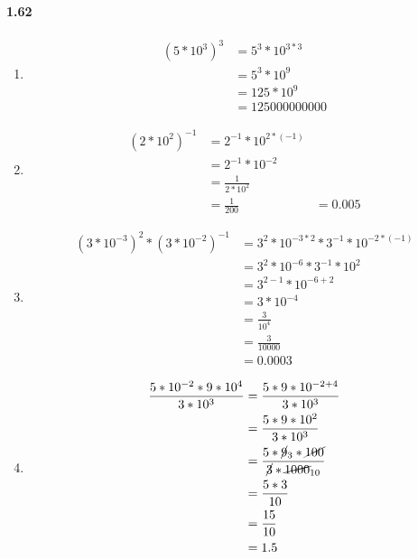 \documentclass{article}
\newcommand\litem[1]{\item{\bfseries#1\space}}
\begin{document}
\paragraph{1.62}
\begin{enumerate}[label=\emph{\alph*})]
\litem{
\begin{align*}
  \left(5 * 10^3\right)^3 &= 5^3 * 10^{3*3} \\
  &= 5^3 * 10^9 \\
  &= 125 * 10^9 \\
  &= 125 000 000 000 
\end{align*}
}
\litem{
\begin{align*}
  \left(2 * 10^2\right)^{-1} &= 2^{-1} * 10^{2 * (-1)} \\
  &= 2^{-1} * 10^{-2} \\
  &= \frac{1}{2 * 10^2} \\ 
  &= \frac{1}{200}
  &= 0.005
\end{align*}
}
\litem{
\begin{align*}
  \left(3 * 10^{-3}\right)^2 * \left(3 * 10^{-2}\right)^{-1} &= 3^2 * 10^{-3 * 2} * 3^{-1} * 10^{-2 * (-1)} \\
  &= 3^2 * 10^{-6} * 3^{-1} * 10^2 \\
  &= 3^{2-1} * 10^{-6 + 2} \\
  &= 3 * 10^{-4} \\
  &= \frac{3}{10^4} \\
  &= \frac{3}{10000} \\
  &= 0.0003
\end{align*}
}
\litem{
\begin{align*}
  \frac{5 * 10^{-2} * 9 * 10^4}{3 * 10^3} &= \frac{5 * 9 * 10^{-2 + 4}}{3 * 10^3} \\
  &= \frac{5 * 9 * 10^{2}}{3 * 10^3} \\
  &= \frac{5 * \cancel{9}_3 * \cancel{100}}{\cancel{3} * \cancel{1000}_{10}} \\
  &= \frac{5 * 3}{10} \\ 
  &= \frac{15}{10} \\
  &= 1.5
\end{align*}
}
\end{enumerate}
\end{document}
